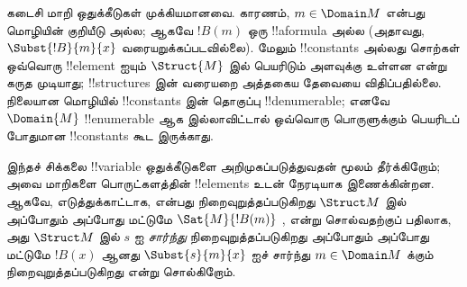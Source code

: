 \documentclass[../../../include/open-logic-section]{subfiles}
\begin{document}
\begin{explain}
கடைசி
 மாறி
ஒதுக்கீடுகள் முக்கியமானவை. காரணம், $m \in
\Domain M$ என்பது மொழியின் குறியீடு அல்ல; ஆகவே $!B(m)$ ஒரு
!!a{formula} அல்ல (அதாவது, $\Subst{!B}{m}{x}$ வரையறுக்கப்படவில்லை).
மேலும் !!{constant}s அல்லது சொற்கள் ஒவ்வொரு !!{element} ஐயும்
$\Struct{M}$ இல் பெயரிடும் அளவுக்கு உள்ளன என்று கருத முடியாது; !!{structure}s
இன் வரையறை அத்தகைய தேவையை விதிப்பதில்லை. நிலையான மொழியில்
!!{constant}s இன் தொகுப்பு !!{denumerable}; எனவே $\Domain{M}$ !!{enumerable}
ஆக இல்லாவிட்டால் ஒவ்வொரு பொருளுக்கும் பெயரிடப் போதுமான !!{constant}s
கூட இருக்காது.

இந்தச் சிக்கலை !!{variable} ஒதுக்கீடுகளை அறிமுகப்படுத்துவதன் மூலம்
தீர்க்கிறோம்; அவை மாறிகளை பொருட்களத்தின் !!{element}s உடன் நேரடியாக
இணைக்கின்றன. ஆகவே, எடுத்துக்காட்டாக,
 என்பது நிறைவுறுத்தப்படுகிறது
$\Struct M$ இல் அப்போதும் அப்போது மட்டுமே $\Sat{M}{!B(m)}$ ,
என்று சொல்வதற்குப் பதிலாக, அது
$\Struct M$ இல் $s$ ஐ \emph{சார்ந்து} நிறைவுறுத்தப்படுகிறது அப்போதும் அப்போது மட்டுமே
$!B(x)$ ஆனது $\Subst{s}{m}{x}$ ஐச் சார்ந்து
 $m \in \Domain M$ க்கும்
நிறைவுறுத்தப்படுகிறது என்று சொல்கிறோம்.
\end{explain}
\end{document}
